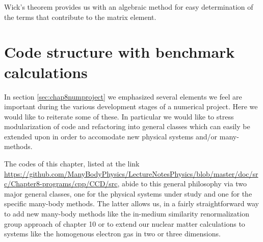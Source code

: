   Wick's theorem provides us with an algebraic method for easy
  determination of the terms that contribute to the matrix element.

  \section*{Code structure with benchmark calculations}
In section \ref{sec:chap8numproject} we emphasized several elements we
feel are important during the various development stages of a
numerical project. Here we would like to reiterate some of these. In
particular we would like to stress modularization of code and
refactoring into general classes which can easily be extended upon in
order to accomodate new physical systems and/or many-methods.

The codes of this chapter, listed at the link
\url{https://github.com/ManyBodyPhysics/LectureNotesPhysics/blob/master/doc/src/Chapter8-programs/cpp/CCD/src},
abide to this general philosophy via two major general classes, one
for the physical systems under study and one for the specific
many-body methods. The latter allows us, in a fairly straightforward
way to add new many-body methods like the in-medium similarity
renormalization group approach of chapter 10 or to extend our nuclear
matter calculations to systems like the homogenous electron gas in two
or three dimensions.

